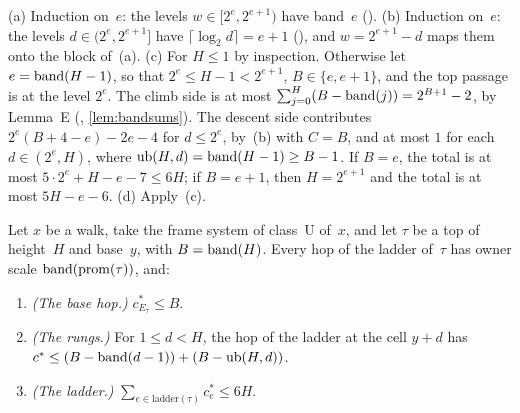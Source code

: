 \begin{outline}
(a) Induction on~$e$: the levels $w\in[2^e,2^{e+1})$ have band~$e$ (). (b) Induction on~$e$: the levels
$d\in(2^e,2^{e+1}]$ have $\lceil\log_2d\rceil=e+1$ (), and $w=2^{e+1}-d$ maps them onto the block of~(a).
(c) For $H\le1$ by inspection. Otherwise let $e=\operatorname{band}(H-1)$, so that $2^e\le H-1<2^{e+1}$, $B\in\{e,e+1\}$, and the top passage
is at the level $2^e$. The climb side is at most $\sum_{j=0}^{H}(B-\operatorname{band}(j))=2^{B+1}-2$, by Lemma~E (,
\cref{lem:bandsums}). The descent side contributes $2^e(B+4-e)-2e-4$ for $d\le2^e$, by~(b) with $C=B$, and at most $1$ for each
$d\in(2^e,H)$, where $\mathrm{ub}(H,d)=\operatorname{band}(H-1)\ge B-1$. If $B=e$, the total is at most $5\cdot2^e+H-e-7\le6H$; if $B=e+1$, then
$H=2^{e+1}$ and the total is at most $5H-e-6$. (d) Apply~(c).
\end{outline}

\begin{lemma}\label{lem:perexc-bound}
Let $x$ be a walk, take the frame system of class~U of~$x$, and let $\tau$ be a top of height~$H$ and base~$y$, with
$B=\operatorname{band}(H)$. Every hop of the ladder of~$\tau$ has owner scale $\operatorname{band}(\operatorname{prom}(\tau))$, and:
\begin{enumerate}[label=(\alph*)]
\item \emph{(The base hop.)} $c^*_{E_\tau}\le B$.
\item \emph{(The rungs.)} For $1\le d<H$, the hop of the ladder at the cell $y+d$ has $c^*\le(B-\operatorname{band}(d-1))+(B-\mathrm{ub}(H,d))$.
\item \emph{(The ladder.)} $\sum_{e\in\text{ladder}(\tau)}c^*_e\le6H$.
\end{enumerate}
\end{lemma}

